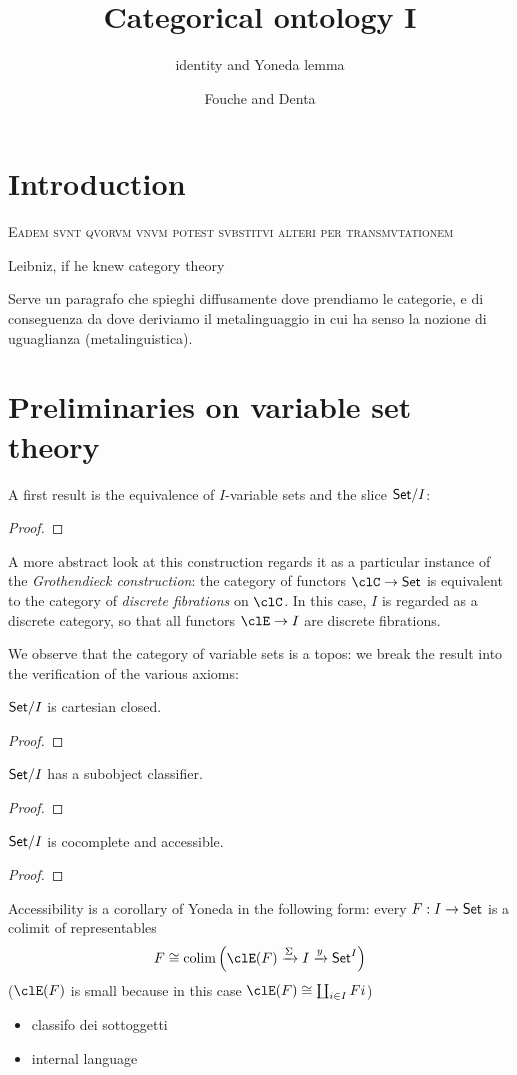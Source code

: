 \documentclass{amsart}
\author{Fouche and Denta}
\title{Categorical ontology I}
\subtitle{identity and Yoneda lemma}
\begin{document}
\maketitle
\section{Introduction}
\epigraph{\textsc{Eadem svnt qvorvm vnvm potest svbstitvi alteri per transmvtationem}}{Leibniz, if he knew category theory}
Serve un paragrafo che spieghi diffusamente dove prendiamo le categorie, e di conseguenza da dove deriviamo il metalinguaggio in cui ha senso la nozione di uguaglianza (metalinguistica).
\section{Preliminaries on variable set theory}
A first result is the equivalence of $I$-variable sets and the slice $\mathsf{Set}/I$: 
\begin{proposition}
  
\end{proposition}
\begin{proof}
  
\end{proof}
\begin{remark}
  A more abstract look at this construction regards it as a particular instance of the \emph{Grothendieck construction}: the category of functors $\clC\to\Set$ is equivalent to the category of \emph{discrete fibrations} on $\clC$. In this case, $I$ is regarded as a discrete category, so that all functors $\clE \to I$ are discrete fibrations.
\end{remark}
We observe that the category of variable sets is a topos: we break the result into the verification of the various axioms:
\begin{proposition}
$\mathsf{Set}/I$ is cartesian closed.
\end{proposition}
\begin{proof}
  
\end{proof}
\begin{proposition}
$\mathsf{Set}/I$ has a subobject classifier.
\end{proposition}
\begin{proof}
  
\end{proof}
\begin{proposition}
$\mathsf{Set}/I$ is cocomplete and accessible.
\end{proposition}
\begin{proof}
  
\end{proof}
Accessibility is a corollary of Yoneda in the following form: every $F : I \to \mathsf{Set}$ is a colimit of representables
\[
F \cong \colim\Big(\clE(F) \xto{\Sigma} I \xto{y} \Set^I\Big)  
\]
($\clE(F)$ is small because in this case $\clE(F)\cong\coprod_{i\in I}Fi$)
\begin{itemize}
  \item classifo dei sottoggetti
  \item internal language
\end{itemize}
\end{document}
